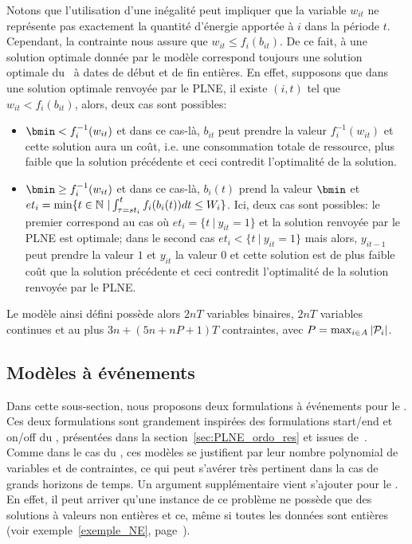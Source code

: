 Notons que l'utilisation d'une inégalité peut impliquer que la
variable $w_{it}$ ne représente pas exactement la quantité d'énergie
apportée à $i$ dans la période $t$. Cependant, la contrainte nous
assure que $w_{it} \le f_i(b_{it})$. De ce fait, à une solution
optimale donnée par le modèle correspond toujours une solution
optimale du \CECSP~à dates de début et de fin entières. En effet,
supposons que dans une solution optimale renvoyée par le PLNE, il
existe $(i,t)$ tel que $w_{it} < f_i(b_{it})$, alors, deux cas sont
possibles:
\begin{itemize}
\item $\bmin < f_i^{-1}(w_{it})$ et dans ce cas-là, $b_{it}$ peut
prendre la valeur $f_i^{-1}(w_{it})$ et cette solution aura un coût,
i.e. une consommation totale de ressource, plus faible que la solution
précédente et ceci contredit l'optimalité de la solution.
\item $\bmin \ge  f_i^{-1}(w_{it})$ et dans ce cas-là, $b_i(t)$ prend la
valeur $\bmin$ et $et_i=\min \{t \in\mathbb{N}\ |\ \\
\int_{\tau=st_i}^{t} f_i(b_i(t))dt \le W_i\}$. Ici, deux cas sont
possibles: le premier correspond au cas où $et_i=\{t\ | \ y_{it}=1\}$
et la solution renvoyée par le PLNE est optimale; dans le second cas
$et_i<\{t\ |\ y_{it}=1\}$ mais alors, $y_{it-1}$ peut prendre la
valeur $1$ et $y_{it}$ la valeur $0$ et cette solution est de plus
faible coût que la solution précédente et ceci contredit l'optimalité
de la solution renvoyée par le PLNE.
\end{itemize}


Le modèle ainsi défini possède alors $2nT$ variables binaires, $2nT$
variables continues et au plus $3n + (5n +nP+1)T$ contraintes, avec
$P=\max_{i\in A}|\P_i|$.  

\subsection{Modèles à événements}

Dans cette sous-section, nous proposons deux formulations à événements pour
le \CECSP. Ces deux formulations sont grandement inspirées des
formulations start/end et on/off du \RCPSP, présentées dans la
section~\ref{sec:PLNE_ordo_res} et issues 
de~\cite{modele_RCPSP}. Comme dans le cas du \RCPSP, ces modèles se
justifient par leur nombre polynomial de variables et de contraintes,
ce qui peut s'avérer très pertinent dans la cas de grands horizons de
temps. Un argument supplémentaire vient s'ajouter pour
le \CECSP. En effet, il peut arriver qu'une instance de ce problème ne
possède que des solutions à valeurs non entières et ce, même si toutes
les données sont entières (voir exemple~\ref{exemple_NE},
page~\pageref{exemple_NE}).



